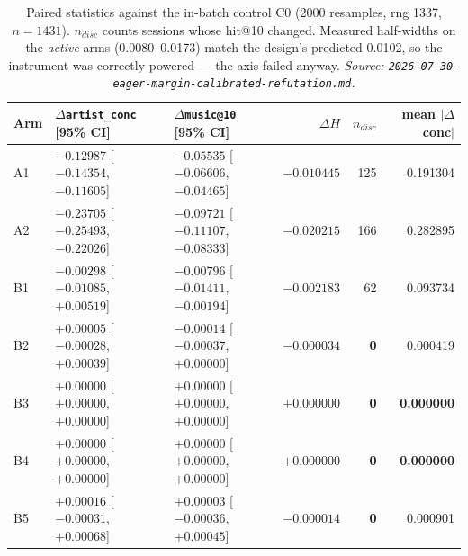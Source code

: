 \documentclass[11pt]{article}
\newcommand{\best}[1]{\textbf{#1}}
\begin{document}
\begin{table}[ht]
  \centering
  \caption{Paired statistics against the in-batch control C0 (\num{2000}
  resamples, rng \num{1337}, $n=\num{1431}$). $n_{disc}$ counts sessions whose
  hit@10 changed. Measured half-widths on the \emph{active} arms
  (\numrange{0.0080}{0.0173}) match the design's predicted \num{0.0102}, so the
  instrument was correctly powered --- the axis failed anyway.
  \emph{Source: \texttt{2026-07-30-eager-margin-calibrated-refutation.md}.}}
  \label{tab:eagermargin-paired}
  {\footnotesize\setlength{\tabcolsep}{4.5pt}\begin{tabular}{lllrrr}
    \toprule
    Arm & $\Delta$\texttt{artist\_conc} [95\% CI] & $\Delta$\texttt{music@10} [95\% CI] & $\Delta H$ & $n_{disc}$ & mean $|\Delta$conc$|$ \\
    \midrule
    A1 & $-0.12987$ [$-0.14354$, $-0.11605$] & $-0.05535$ [$-0.06606$, $-0.04465$] & $-0.010445$ & 125 & 0.191304 \\
    A2 & $-0.23705$ [$-0.25493$, $-0.22026$] & $-0.09721$ [$-0.11107$, $-0.08333$] & $-0.020215$ & 166 & 0.282895 \\
    B1 & $-0.00298$ [$-0.01085$, $+0.00519$] & $-0.00796$ [$-0.01411$, $-0.00194$] & $-0.002183$ & 62 & 0.093734 \\
    B2 & $+0.00005$ [$-0.00028$, $+0.00039$] & $-0.00014$ [$-0.00037$, $+0.00000$] & $-0.000034$ & \best{0} & 0.000419 \\
    B3 & $+0.00000$ [$+0.00000$, $+0.00000$] & $+0.00000$ [$+0.00000$, $+0.00000$] & $+0.000000$ & \best{0} & \best{0.000000} \\
    B4 & $+0.00000$ [$+0.00000$, $+0.00000$] & $+0.00000$ [$+0.00000$, $+0.00000$] & $+0.000000$ & \best{0} & \best{0.000000} \\
    B5 & $+0.00016$ [$-0.00031$, $+0.00068$] & $+0.00003$ [$-0.00036$, $+0.00045$] & $-0.000014$ & \best{0} & 0.000901 \\
    \bottomrule
  \end{tabular}}
\end{table}
\end{document}
